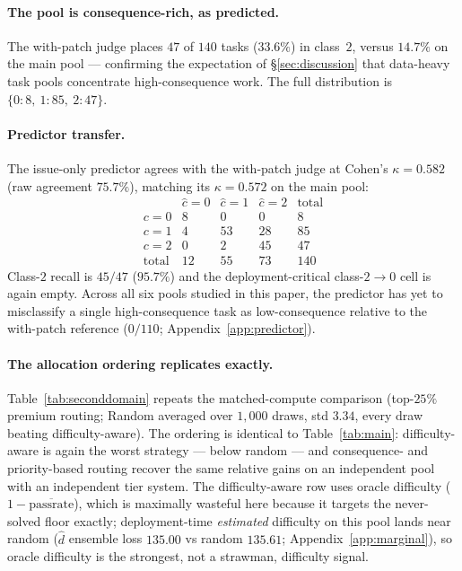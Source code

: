 \documentclass{article}
\begin{document}
\paragraph{The pool is consequence-rich, as predicted.} The
with-patch judge places $47$ of $140$ tasks ($33.6\%$) in class~$2$,
versus $14.7\%$ on the main pool --- confirming the expectation of
\S\ref{sec:discussion} that data-heavy task pools concentrate
high-consequence work. The full distribution is
$\{0{:}8,\ 1{:}85,\ 2{:}47\}$.

\paragraph{Predictor transfer.} The issue-only predictor agrees
with the with-patch judge at Cohen's $\kappa = 0.582$ (raw agreement
$75.7\%$), matching its $\kappa = 0.572$ on the main pool:
\[
\begin{array}{c|ccc|c}
& \hat{c}{=}0 & \hat{c}{=}1 & \hat{c}{=}2 & \text{total} \\\hline
c{=}0 & 8 & 0  & 0  & 8   \\
c{=}1 & 4 & 53 & 28 & 85  \\
c{=}2 & 0 & 2  & 45 & 47  \\\hline
\text{total} & 12 & 55 & 73 & 140
\end{array}
\]
Class-$2$ recall is $45/47$ ($95.7\%$) and the deployment-critical
class-$2{\to}0$ cell is again empty. Across all six pools studied in this paper, the predictor has yet
to misclassify a single high-consequence task as low-consequence
relative to the with-patch reference ($0/110$;
Appendix~\ref{app:predictor}).

\paragraph{The allocation ordering replicates exactly.}
Table~\ref{tab:seconddomain} repeats the matched-compute comparison
(top-$25\%$ premium routing; Random averaged over $1{,}000$ draws,
std $3.34$, every draw beating difficulty-aware). The ordering is
identical to Table~\ref{tab:main}: difficulty-aware is again the
worst strategy --- below random --- and consequence- and
priority-based routing recover the same relative gains on an
independent pool with an independent tier system. The difficulty-aware
row uses oracle difficulty ($1-\overline{\mathrm{passrate}}$), which is
maximally wasteful here because it targets the never-solved floor
exactly; deployment-time \emph{estimated} difficulty on this pool lands
near random ($\hat{d}$ ensemble loss $135.00$ vs random $135.61$;
Appendix~\ref{app:marginal}), so oracle difficulty is the strongest,
not a strawman, difficulty signal.
\end{document}
